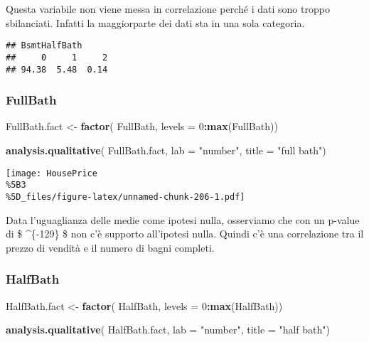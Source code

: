 \documentclass[
]{article}
\newenvironment{Shaded}{\begin{snugshade}}{\end{snugshade}}
\newcommand{\AttributeTok}[1]{\textcolor[rgb]{0.13,0.29,0.53}{#1}}
\newcommand{\DecValTok}[1]{\textcolor[rgb]{0.00,0.00,0.81}{#1}}
\newcommand{\FunctionTok}[1]{\textcolor[rgb]{0.13,0.29,0.53}{\textbf{#1}}}
\newcommand{\NormalTok}[1]{#1}
\newcommand{\OtherTok}[1]{\textcolor[rgb]{0.56,0.35,0.01}{#1}}
\newcommand{\SpecialCharTok}[1]{\textcolor[rgb]{0.81,0.36,0.00}{\textbf{#1}}}
\newcommand{\StringTok}[1]{\textcolor[rgb]{0.31,0.60,0.02}{#1}}
\begin{document}
Questa variabile non viene messa in correlazione perché i dati sono
troppo sbilanciati. Infatti la maggiorparte dei dati sta in una sola
categoria.

\begin{verbatim}
## BsmtHalfBath
##     0     1     2 
## 94.38  5.48  0.14
\end{verbatim}

\subsubsection{FullBath}\label{fullbath-1}

\begin{Shaded}
\begin{Highlighting}[]
\NormalTok{FullBath.fact }\OtherTok{\textless{}{-}} \FunctionTok{factor}\NormalTok{(}
\NormalTok{    FullBath,}
    \AttributeTok{levels =} \DecValTok{0}\SpecialCharTok{:}\FunctionTok{max}\NormalTok{(FullBath))}

\FunctionTok{analysis.qualitative}\NormalTok{(}
\NormalTok{    FullBath.fact,}
    \AttributeTok{lab =} \StringTok{"number"}\NormalTok{,}
    \AttributeTok{title =} \StringTok{"full bath"}\NormalTok{)}
\end{Highlighting}
\end{Shaded}

\texttt{[image: HousePrice\\\%5B3\\\%5D\_files/figure-latex/unnamed-chunk-206-1.pdf]}

Data l'uguaglianza delle medie come ipotesi nulla, osserviamo che con un
p-value di \$ \^{}\{-129\} \$ non c'è supporto all'ipotesi
nulla. Quindi c'è una correlazione tra il prezzo di vendità e il numero
di bagni completi.

\subsubsection{HalfBath}\label{halfbath-1}

\begin{Shaded}
\begin{Highlighting}[]
\NormalTok{HalfBath.fact }\OtherTok{\textless{}{-}} \FunctionTok{factor}\NormalTok{(}
\NormalTok{    HalfBath,}
    \AttributeTok{levels =} \DecValTok{0}\SpecialCharTok{:}\FunctionTok{max}\NormalTok{(HalfBath))}

\FunctionTok{analysis.qualitative}\NormalTok{(}
\NormalTok{    HalfBath.fact,}
    \AttributeTok{lab =} \StringTok{"number"}\NormalTok{,}
    \AttributeTok{title =} \StringTok{"half bath"}\NormalTok{)}
\end{Highlighting}
\end{Shaded}
\end{document}

